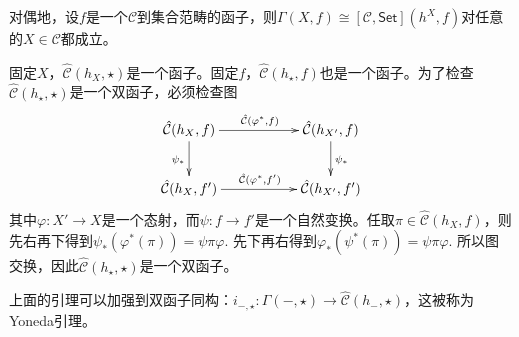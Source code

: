 对偶地，设$f$是一个$\mathcal{C}$到集合范畴的函子，则$\Gamma(X,f)\cong [\mathcal{C},\mathsf{Set}](h^X,f)$对任意的$X\in \mathcal{C}$都成立。





\para 固定$X$，${\hat{\mathcal{C}}}(h_X,\star)$是一个函子。固定$f$，${\hat{\mathcal{C}}}(h_\star,f)$也是一个函子。为了检查${\hat{\mathcal{C}}}(h_\star,\star)$是一个双函子，必须检查图
\[
\begin{xy}
	\xymatrix{
		\hat{\mathcal{C}}(h_{X},f)\ar[rr]^{\hat{\mathcal{C}}(\varphi^*,f)} \ar[d]_{\psi_*}&&\hat{\mathcal{C}}(h_{X'},f) \ar[d]^{\psi_*}\\
		\hat{\mathcal{C}}(h_{X},f')\ar[rr]^{\hat{\mathcal{C}}(\varphi^*,f')}&&\hat{\mathcal{C}}(h_{X'},f')
	}
\end{xy}
\]
其中$\varphi:X'\to X$是一个态射，而$\psi:f\to f'$是一个自然变换。任取$\pi\in \hat{\mathcal{C}}(h_{X},f)$，则先右再下得到$\psi_*(\varphi^*(\pi))=\psi\pi\varphi$. 先下再右得到$\varphi_*(\psi^*(\pi))=\psi\pi\varphi$. 所以图交换，因此${\hat{\mathcal{C}}}(h_\star,\star)$是一个双函子。

\begin{pro}
上面的引理可以加强到双函子同构：$i_{-,\star}:\Gamma(-,\star)\to {\hat{\mathcal{C}}}(h_-,\star)$，这被称为Yoneda引理。
\end{pro}


